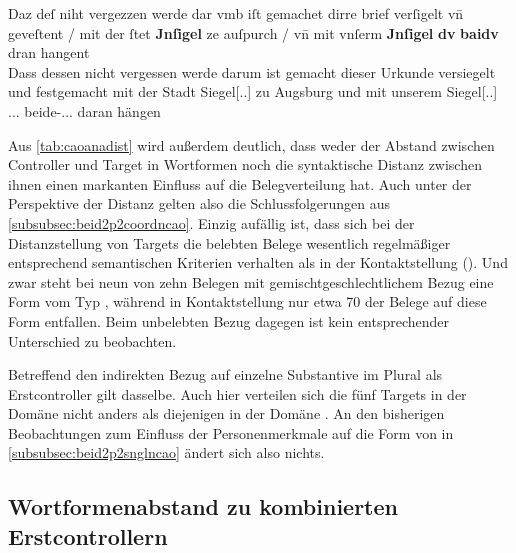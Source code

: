 \begin{exe}
\ex\label{ex:insigel}
	\gll Daz deſ niht vergezzen werde {dar vmb} iſt gemachet dirre brief
			verſigelt vn̄ geveſtent / mit der ſtet \textbf{Jnſigel} ze auſpurch
			/ vn̄ mit vnſerm \textbf{Jnſigel} \textbf{dv}
			\textbf{baidv} dran hangent \\			
		Dass dessen nicht vergessen werde darum ist gemacht dieser Urkunde
			versiegelt und festgemacht {} mit der Stadt Siegel[\Dat.\Sg.\NeutI]
			zu Augsburg {} und mit unserem Siegel[\Dat.\Sg.\NeutI]
			\Rel.\Nom.\Pl.\NeutI{} beide-\Nom.\Pl.\NeutI.\St{} daran hängen \\
	\begin{taggedline}{\parencites(Augsburg, 1298)[\pno~3056, 304.15--17]{cao4}}
	\end{taggedline}
\end{exe}

Aus \cref{tab:caoanadist} wird außerdem deutlich, dass weder der Abstand
zwischen Controller und Target in Wortformen noch die syntaktische Distanz
zwischen ihnen einen markanten Einfluss auf die Belegverteilung hat. Auch unter
der Perspektive der Distanz gelten also die Schlussfolgerungen aus
\cref{subsubsec:beid2p2coordncao}. Einzig aufällig ist, dass sich bei der
Distanzstellung von Targets die belebten Belege wesentlich regelmäßiger
entsprechend semantischen Kriterien verhalten als in der Kontaktstellung
(). Und zwar steht bei neun von zehn Belegen mit
gemischtgeschlechtlichem Bezug eine Form vom Typ , während in
Kontaktstellung nur etwa 70\pct{} der Belege auf diese Form entfallen. Beim
unbelebten Bezug dagegen ist kein entsprechender Unterschied zu beobachten.

Betreffend den indirekten Bezug auf einzelne Substantive im Plural als
Erstcontroller gilt dasselbe. Auch hier verteilen sich die fünf Targets in der
Domäne  nicht anders als diejenigen in der Domäne
. An den bisherigen Beobachtungen zum
Einfluss der Personenmerkmale auf die Form von  in
\cref{subsubsec:beid2p2snglncao} ändert sich also nichts.

\subsection{Wortformenabstand zu kombinierten Erstcontrollern}

